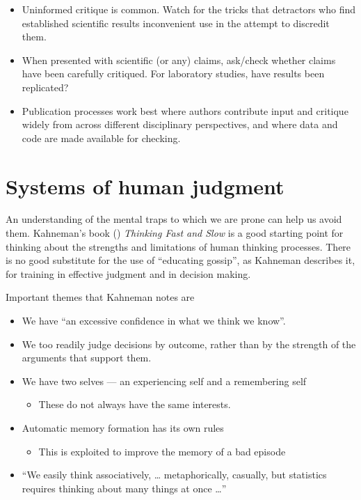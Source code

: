 \documentclass[
  10ptls,
  b5paper]{book}
\providecommand{\tightlist}{%
  \setlength{\itemsep}{0pt}\setlength{\parskip}{0pt}}
\begin{document}
\begin{enumerate}
  \begin{itemize}
  \tightlist
  \item
    Uninformed critique is common. Watch for the tricks that
    detractors who find established scientific results inconvenient
    use in the attempt to discredit them.
  \item
    When presented with scientific (or any) claims, ask/check
    whether claims have been carefully critiqued. For laboratory
    studies, have results been replicated?
  \item
    Publication processes work best where authors contribute
    input and critique widely from across different disciplinary
    perspectives, and where data and code are made available for
    checking.
  \end{itemize}
\end{enumerate}

\mainmatter

\chapter{Systems of human judgment}\label{systems-of-human-judgment}

An understanding of the mental traps to which we are prone can help us avoid them. Kahneman's book () \emph{Thinking Fast and Slow} is a good starting point for thinking about the strengths and limitations of human thinking processes. There is no good substitute for the use of ``educating gossip'', as Kahneman describes it, for training in effective judgment and in decision making.

Important themes that Kahneman notes are

\begin{itemize}
\tightlist
\item
  We have ``an excessive confidence in what we think we know''.
\item
  We too readily judge decisions by outcome, rather than by the
  strength of the arguments that support them.
\item
  We have two selves --- an experiencing self and a remembering self

  \begin{itemize}
  \tightlist
  \item
    These do not always have the same interests.
  \end{itemize}
\item
  Automatic memory formation has its own rules

  \begin{itemize}
  \tightlist
  \item
    This is exploited to improve the memory of a bad episode
  \end{itemize}
\item
  ``We easily think associatively, \ldots{} metaphorically, casually, but statistics requires thinking about many things at once \ldots{}''
\end{itemize}
\end{document}
